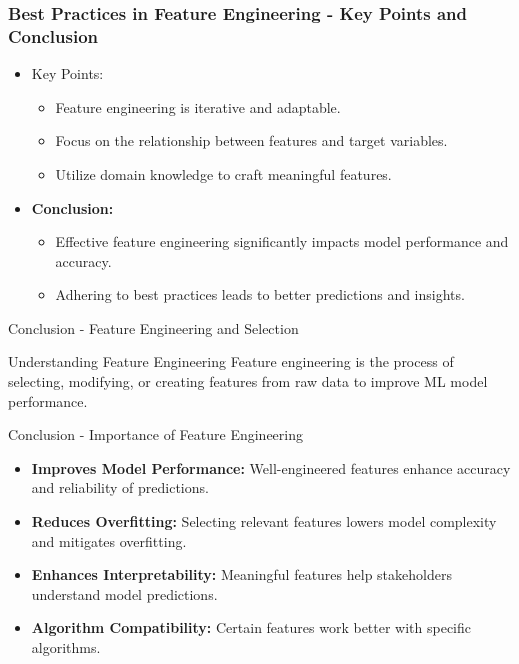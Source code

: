 \documentclass[aspectratio=169]{beamer}
\begin{document}
\begin{frame}[fragile]
    \frametitle{Best Practices in Feature Engineering - Key Points and Conclusion}
    \begin{itemize}
        \item Key Points:
        \begin{itemize}
            \item Feature engineering is iterative and adaptable.
            \item Focus on the relationship between features and target variables.
            \item Utilize domain knowledge to craft meaningful features.
        \end{itemize}
        \item \textbf{Conclusion:} 
        \begin{itemize}
            \item Effective feature engineering significantly impacts model performance and accuracy.
            \item Adhering to best practices leads to better predictions and insights.
        \end{itemize}
    \end{itemize}
\end{frame}

\begin{frame}[fragile]{Conclusion - Feature Engineering and Selection}
    \begin{block}{Understanding Feature Engineering}
        Feature engineering is the process of selecting, modifying, or creating features from raw data to improve ML model performance.
    \end{block}
\end{frame}

\begin{frame}[fragile]{Conclusion - Importance of Feature Engineering}
    \begin{itemize}
        \item \textbf{Improves Model Performance:} Well-engineered features enhance accuracy and reliability of predictions.
        \item \textbf{Reduces Overfitting:} Selecting relevant features lowers model complexity and mitigates overfitting.
        \item \textbf{Enhances Interpretability:} Meaningful features help stakeholders understand model predictions.
        \item \textbf{Algorithm Compatibility:} Certain features work better with specific algorithms.
    \end{itemize}
\end{frame}
\end{document}
